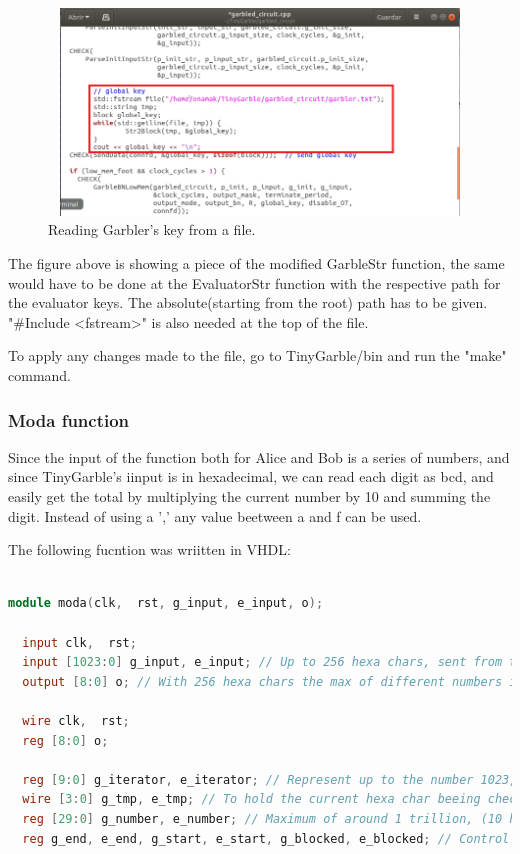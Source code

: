 \begin{refsection}
\begin{figure}[H]
	\centering
	\includegraphics[width=1\textwidth, height=5.5cm]{./sdf/tiny_garble/figures/key_file.png}
    \caption{Reading Garbler's key from a file.}\label{fig:key_file}
\end{figure}

The figure above is showing a piece of the modified GarbleStr function, the same would have to be done at the EvaluatorStr function with the respective path for the evaluator keys. The absolute(starting from the root) path has to be given. "\#Include <fstream>" is also needed at the top of the file. 

To apply any changes made to the file, go to TinyGarble/bin and run the "make" command.

\subsubsection{Moda function}

Since the input of the function both for Alice and Bob is a series of numbers, and since TinyGarble's iinput is in hexadecimal, we can read each digit as bcd, and easily get the total by multiplying the current number by 10 and summing the digit. Instead of using a ',' any value beetween a and f can be used.

The following fucntion was wriitten in VHDL:

\begin{lstlisting}[caption={moda.vhd}, language=Verilog, captionpos=b]

module moda(clk,  rst, g_input, e_input, o);

  input clk,  rst;
  input [1023:0] g_input, e_input; // Up to 256 hexa chars, sent from the testbench
  output [8:0] o; // With 256 hexa chars the max of different numbers is 512 (256 / 2 (commas) * 4)

  wire clk,  rst;
  reg [8:0] o;

  reg [9:0] g_iterator, e_iterator; // Represent up to the number 1023, to iterate the inputs
  wire [3:0] g_tmp, e_tmp; // To hold the current hexa char beeing checked
  reg [29:0] g_number, e_number; // Maximum of around 1 trillion, (10 hexa digits, because in bcd)
  reg g_end, e_end, g_start, e_start, g_blocked, e_blocked; // Control registers


\end{lstlisting}
\end{refsection}
